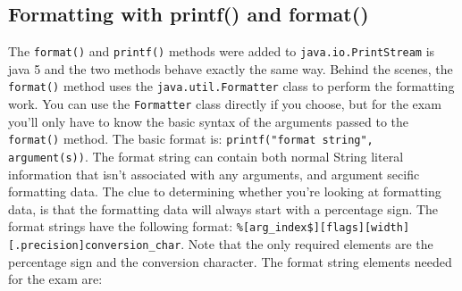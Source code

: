 \subsection{Formatting with printf() and format()}
The \verb#format()# and \verb#printf()# methods were added to 
\verb#java.io.PrintStream# is java 5 and the two methods behave exactly the 
same way. Behind the scenes, the \verb#format()# method uses the 
\verb#java.util.Formatter# class to perform the formatting work. You can use 
the \verb#Formatter# class directly if you choose, but for the exam you'll only 
have to know the basic syntax of the arguments passed to the \verb#format()# 
method. The basic format is: \verb#printf("format string", argument(s))#. The 
format string can contain both normal String literal information that isn't 
associated with any arguments, and argument secific formatting data. The clue 
to determining whether you're looking at formatting data, is that the 
formatting data will always start with a percentage sign. The format strings 
have the following format:
\verb#%[arg_index$][flags][width][.precision]conversion_char#. Note that the 
only required elements are the percentage sign and the conversion character.  
The format string elements needed for the exam are:
